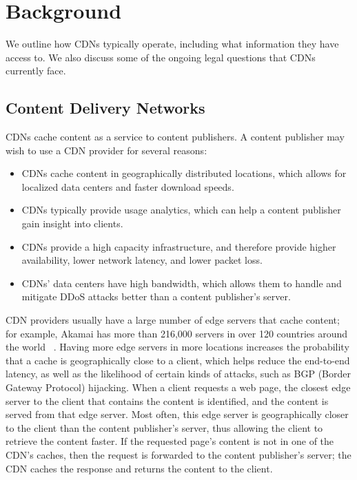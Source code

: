 \section{Background}
\label{sec:background}

We outline how CDNs typically operate, including what information they have access to. We also discuss some of the ongoing legal questions that CDNs currently face.

\subsection{Content Delivery Networks}
CDNs cache content as a service to content publishers. A 
content publisher may wish to use a CDN provider for several reasons:

\begin{itemize}[noitemsep]
\item CDNs cache content in geographically distributed locations, which allows for localized data centers and faster download speeds.
\item CDNs typically provide usage analytics, which can help a content publisher gain insight into clients.
\item CDNs provide a high capacity infrastructure, and therefore provide higher availability, lower network latency, and lower packet loss.  
\item CDNs' data centers have high bandwidth, which allows them to handle and mitigate DDoS attacks better than a content publisher's server.
\end{itemize}

CDN providers usually have a large number of edge servers that cache content;
for example, Akamai has more than 216,000 servers in over 120 countries around
the world~ \cite{akamai_facts}.  Having more edge servers in more locations
increases the probability that a cache is geographically close to a client,
which helps reduce the end-to-end latency, as well as the likelihood of
certain kinds of attacks, such as BGP (Border Gateway Protocol) hijacking.
When a client requests a web page, the closest edge server to the client that
contains the content is identified, and the content is served from that edge
server.  Most often, this edge server is geographically closer to the client
than the content publisher's server, thus allowing the client to retrieve the
content faster. If the requested page's content is not in one of the CDN's
caches, then the request is forwarded to the content publisher's server; the
CDN caches the response and returns the content to the client.

